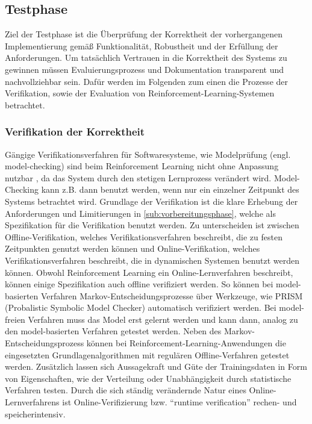 \subsection{Testphase}\label{sub:testphase}
Ziel der Testphase ist die Überprüfung der Korrektheit der vorhergangenen Implementierung gemäß Funktionalität, Robustheit und der Erfüllung der Anforderungen.
Um tatsächlich Vertrauen in die Korrektheit des Systems zu gewinnen müssen Evaluierungsprozess und Dokumentation transparent und nachvollziehbar sein.
Dafür werden im Folgenden zum einen die Prozesse der Verifikation, sowie der Evaluation von Reinforcement-Learning-Systemen betrachtet.

\subsubsection{Verifikation der Korrektheit}
Gängige Verifikationsverfahren für Softwaresysteme, wie Modelprüfung (engl. model-checking) sind beim Reinforcement Learning nicht ohne Anpassung nutzbar \cite[S. 12 ff.]{vanwesel2017}, da das System durch den stetigen Lernprozess verändert wird.
Model-Checking kann z.B. dann benutzt werden, wenn nur ein einzelner Zeitpunkt des Systems betrachtet wird.
Grundlage der Verifikation ist die klare Erhebung der Anforderungen und Limitierungen in \autoref{sub:vorbereitungsphase}, welche als Spezifikation für die Verifikation benutzt werden.
Zu unterscheiden ist zwischen Offline-Verifikation, welches Verifikationsverfahren beschreibt, die zu festen Zeitpunkten genutzt werden können und Online-Verifikation, welches Verifikationsverfahren beschreibt, die in dynamischen Systemen benutzt werden können.
\ab 
Obwohl Reinforcement Learning ein Online-Lernverfahren beschreibt, können einige Spezifikation auch offline verifiziert werden.
So können bei model-basierten Verfahren Markov-Entscheidungsprozesse über Werkzeuge, wie PRISM (Probalistic Symbolic Model Checker) \cite{prism} automatisch verifiziert werden.
Bei model-freien Verfahren muss das Model erst gelernt werden und kann dann, analog zu den model-basierten Verfahren getestet werden.
Neben des Markov-Entscheidungsprozess können bei Reinforcement-Learning-Anwendungen die eingesetzten Grundlagenalgorithmen mit regulären Offline-Verfahren getestet werden.
Zusätzlich lassen sich Aussagekraft und Güte der Trainingsdaten in Form von Eigenschaften, wie der Verteilung oder Unabhängigkeit durch statistische Verfahren testen.
\ab
Durch die sich ständig verändernde Natur eines Online-Lernverfahrens ist Online-Verifizierung bzw. \enquote{runtime verification} \cite[S. 16]{vanwesel2017} rechen- und speicherintensiv.
